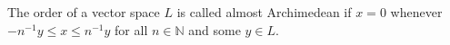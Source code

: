 The order of a vector space $L$ is called almost Archimedean if $x = 0$ whenever $-n^{-1}y \leq x \leq n^{-1}y$ for all $n \in \mathbb{N}$ and some $y \in L$.
